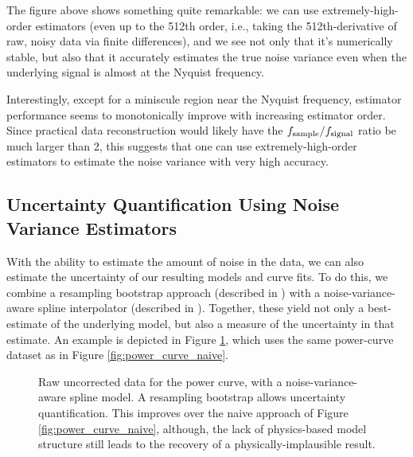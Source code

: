 \documentclass[conf]{new-aiaa}
\begin{document}
    The figure above shows something quite remarkable: we can use extremely-high-order estimators (even up to the 512th order, i.e., taking the 512th-derivative of raw, noisy data via finite differences), and we see not only that it's numerically stable, but also that it accurately estimates the true noise variance even when the underlying signal is almost at the Nyquist frequency.

    Interestingly, except for a miniscule region near the Nyquist frequency, estimator performance seems to monotonically improve with increasing estimator order. Since practical data reconstruction would likely have the $f_{\rm sample} / f_{\rm signal}$ ratio be much larger than 2, this suggests that one can use extremely-high-order estimators to estimate the noise variance with very high accuracy.

    \subsection{Uncertainty Quantification Using Noise Variance Estimators}

    With the ability to estimate the amount of noise in the data, we can also estimate the uncertainty of our resulting models and curve fits. To do this, we combine a resampling bootstrap approach (described in \cite{surrogates, elements_of_statistical_learning}) with a noise-variance-aware spline interpolator (described in \cite{surrogates, wahba}). Together, these yield not only a best-estimate of the underlying model, but also a measure of the uncertainty in that estimate. An example is depicted in Figure \ref{fig:power_curve_spline_but_no_physics}, which uses the same power-curve dataset as in Figure \ref{fig:power_curve_naive}.

    \begin{figure}[!htb]
        \centering
        \caption{Raw uncorrected data for the power curve, with a noise-variance-aware spline model. A resampling bootstrap allows uncertainty quantification. This improves over the naive approach of Figure \ref{fig:power_curve_naive}, although, the lack of physics-based model structure still leads to the recovery of a physically-implausible result.}
        \label{fig:power_curve_spline_but_no_physics}
    \end{figure}
\end{document}
